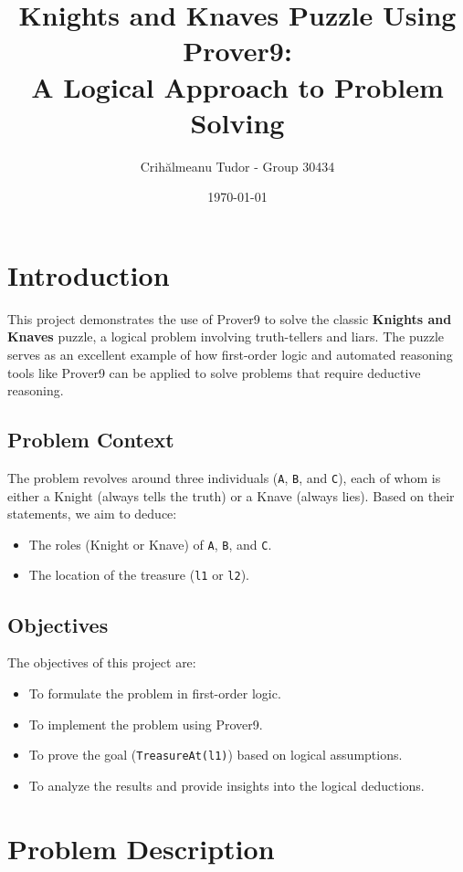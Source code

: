\documentclass[a4paper,12pt]{article}
\title{Knights and Knaves Puzzle Using Prover9: \\
A Logical Approach to Problem Solving}
\author{Crihălmeanu Tudor - Group 30434}
\date{\today}
\begin{document}
\maketitle

\tableofcontents
\newpage

\section{Introduction}
This project demonstrates the use of Prover9 to solve the classic \textbf{Knights and Knaves}  puzzle, a logical problem involving truth-tellers and liars. The puzzle serves as an excellent example of how first-order logic and automated reasoning tools like Prover9 can be applied to solve problems that require deductive reasoning.

\subsection{Problem Context}
The problem revolves around three individuals (\texttt{A}, \texttt{B}, and \texttt{C}), each of whom is either a Knight (always tells the truth) or a Knave (always lies). Based on their statements, we aim to deduce:
\begin{itemize}
    \item The roles (Knight or Knave) of \texttt{A}, \texttt{B}, and \texttt{C}.
    \item The location of the treasure (\texttt{l1} or \texttt{l2}).
\end{itemize}

\subsection{Objectives}
The objectives of this project are:
\begin{itemize}
    \item To formulate the problem in first-order logic.
    \item To implement the problem using Prover9.
    \item To prove the goal (\texttt{TreasureAt(l1)}) based on logical assumptions.
    \item To analyze the results and provide insights into the logical deductions.
\end{itemize}

\section{Problem Description}
\end{document}
